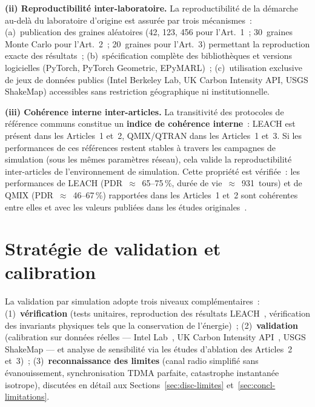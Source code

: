 \noindent\textbf{(ii) Reproductibilité inter-laboratoire.}
La reproductibilité de la démarche au-delà du laboratoire d'origine est assurée par trois mécanismes~: (a)~publication des graines aléatoires (42, 123, 456 pour l'Art.~1~; 30~graines Monte Carlo pour l'Art.~2~; 20~graines pour l'Art.~3) permettant la reproduction exacte des résultats~; (b)~spécification complète des bibliothèques et versions logicielles (PyTorch, PyTorch Geometric, EPyMARL)~; (c)~utilisation exclusive de jeux de données publics (Intel Berkeley Lab, UK Carbon Intensity API, USGS ShakeMap) accessibles sans restriction géographique ni institutionnelle.

\noindent\textbf{(iii) Cohérence interne inter-articles.}
La transitivité des protocoles de référence communs constitue un \textbf{indice de cohérence interne}~: LEACH est présent dans les Articles~1 et~2, QMIX/QTRAN dans les Articles~1 et~3. Si les performances de ces références restent stables à travers les campagnes de simulation (sous les mêmes paramètres réseau), cela valide la reproductibilité inter-articles de l'environnement de simulation. Cette propriété est vérifiée~: les performances de LEACH (PDR~$\approx$~65--75\,\%, durée de vie~$\approx$~931~tours) et de QMIX (PDR~$\approx$~46--67\,\%) rapportées dans les Articles~1 et~2 sont cohérentes entre elles et avec les valeurs publiées dans les études originales~\cite{heinzelman2000leach, rashid2018qmix}.


\section{Stratégie de validation et calibration}\label{sec:demarche-validation}

La validation par simulation adopte trois niveaux complémentaires~: (1)~\textbf{vérification} (tests unitaires, reproduction des résultats LEACH~\cite{heinzelman2000leach}, vérification des invariants physiques tels que la conservation de l'énergie)~; (2)~\textbf{validation} (calibration sur données réelles --- Intel Lab~\cite{intel_lab_data}, UK Carbon Intensity API~\cite{uk_carbon_api}, USGS ShakeMap --- et analyse de sensibilité via les études d'ablation des Articles~2 et~3)~; (3)~\textbf{reconnaissance des limites} (canal radio simplifié sans évanouissement, synchronisation TDMA parfaite, catastrophe instantanée isotrope), discutées en détail aux Sections~\ref{sec:disc-limites} et~\ref{sec:concl-limitations}.

